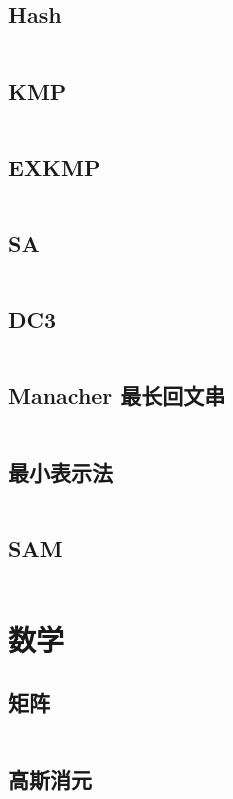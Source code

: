 \documentclass[titlepage,landscape,a4paper,10pt]{article}
\begin{document}
\begin{multicols}{2}
\begin{spacing}{0.8}
\subsection{Hash}
\inputminted{cpp}{Strings/BKDRHash.cpp}

\subsection{KMP}
\inputminted{cpp}{Strings/KMP.cpp}

\subsection{EXKMP}
\inputminted{cpp}{Strings/EXKMP.cpp}

\subsection{SA}
\inputminted{cpp}{Strings/SA.cpp}

\subsection{DC3}
\inputminted{cpp}{Strings/DC3.cpp}

\subsection{Manacher 最长回文串}
\inputminted{cpp}{Strings/Manacher.cpp}

\subsection{最小表示法}
\inputminted{cpp}{Strings/最小表示法.cpp}

\subsection{SAM}
\inputminted{cpp}{Strings/SAM.cpp}

\section{数学}

\subsection{矩阵}
\inputminted{cpp}{Math/Matrix.cpp}

\subsection{高斯消元}
\inputminted{cpp}{Math/高斯消元.cpp}


\end{spacing}
\end{multicols}
\end{document}
